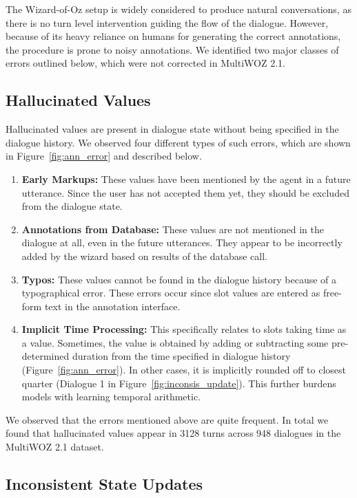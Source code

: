 The Wizard-of-Oz setup is widely considered to produce natural conversations, as there is no turn level intervention guiding the flow of the dialogue. However, because of its heavy reliance on humans for generating the correct annotations, the procedure is prone to noisy annotations. We identified two major classes of errors outlined below, which were not corrected in MultiWOZ 2.1.

\subsection{Hallucinated Values}
\label{sec:hallucinated}
Hallucinated values are present in dialogue state without being specified in the dialogue history. We observed four different types of such errors, which are shown in Figure~\ref{fig:ann_error} and described below. 

\begin{enumerate}[style=nextline,leftmargin=*]
    \item \textbf{Early Markups:} These values have been mentioned by the agent in a future utterance. Since the user has not accepted them yet, they should be excluded from the dialogue state.
    \item \textbf{Annotations from Database:}
    These values are not mentioned in the dialogue at all, even in the future utterances. They appear to be incorrectly added by the wizard based on results of the database call.%
    \item \textbf{Typos:} These values cannot be found in the dialogue history because of a typographical error. These errors occur since slot values are entered as free-form text in the annotation interface.
    \item \textbf{Implicit Time Processing:} This specifically relates to slots taking time as a value. Sometimes, the value is obtained by adding or subtracting some pre-determined duration from the time specified in dialogue history (Figure~\ref{fig:ann_error}). In other cases, it is implicitly rounded off to closest quarter (Dialogue 1 in Figure~\ref{fig:inconsis_update}). This further burdens models with learning temporal arithmetic.
\end{enumerate}

We observed that the errors mentioned above are quite frequent.
In total we found that hallucinated values appear in 3128 turns across 948 dialogues in the MultiWOZ 2.1 dataset.

\subsection{Inconsistent State Updates}
\label{sec:inconsis_issues}

